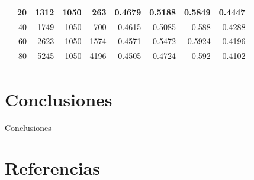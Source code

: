 \documentclass[a4paper]{llncs}
\begin{document}
\begin{table}[htbp!]
\begin{tabular}{crrrrrrrr}
                                & \textbf{20}                   & \textbf{1312}             & \textbf{1050}            & \textbf{263}               & \textbf{0.4679}            & \textbf{0.5188}               & \textbf{0.5849}         & \textbf{0.4447}        \\
                                & 40                            & 1749                      & 1050                     & 700                        & 0.4615                     & 0.5085                        & 0.588                   & 0.4288                 \\
                                & 60                            & 2623                      & 1050                     & 1574                       & 0.4571                     & 0.5472                        & 0.5924                  & 0.4196                 \\
                                & 80                            & 5245                      & 1050                     & 4196                       & 0.4505                     & 0.4724                        & 0.592                   & 0.4102                 \\ \hline
\end{tabular}%
\end{table}

\clearpage
\section{Conclusiones}
\label{sec:org58ea8f4}
Conclusiones

\section{Referencias}
\label{sec:org856da34}
\printbibliography
\end{document}
